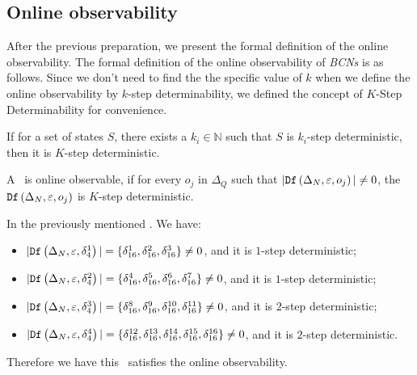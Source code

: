 \subsection{Online observability}
After the previous preparation, we present the formal definition of the online observability. The formal definition of the online observability of {\em BCNs} is as follows.
Since we don't need to find the the specific value of $k$ when we define the online observability by $k$-step determinability, we defined the concept of $K$-Step Determinability for convenience.
\begin{definition} 
If for a set of states $S$, there exists a $k_i\in \mathbb{N}$ such that $S$ is $k_i$-step deterministic, then it is $K$-step deterministic.
\end{definition}

\begin{definition}
 A \BCN\ is online observable,
if for every  $o_j$ in $\Delta_Q$ such that $|{\tt Df}\left(\Delta_N,\varepsilon, o_j\right)|\neq 0$, the ${\tt Df}\left(\Delta_N,\varepsilon,o_j\right)$ is $K$-step deterministic.
\end{definition}


\begin{example}
In the previously mentioned \BCN. We have:
 \begin{itemize}
 \item $|{\tt Df}\left(\Delta_N,\varepsilon, \delta_{4}^1\right)|=\{\delta_{16}^1,\delta_{16}^2,\delta_{16}^3\}\neq 0$, and it is $1$-step deterministic;
 \item $|{\tt Df}\left(\Delta_N,\varepsilon, \delta_{4}^2\right)|=\{\delta_{16}^4,\delta_{16}^5,\delta_{16}^6,\delta_{16}^7\}\neq 0$, and it is $1$-step deterministic;
 \item $|{\tt Df}\left(\Delta_N,\varepsilon, \delta_{4}^3\right)|=\{\delta_{16}^8,\delta_{16}^9,\delta_{16}^{10},\delta_{16}^{11}\}\neq 0$, and it is $2$-step deterministic;
 \item $|{\tt Df}\left(\Delta_N,\varepsilon, \delta_{4}^4\right)|=\{\delta_{16}^{12},\delta_{16}^{13},\delta_{16}^{14},\delta_{16}^{15},\delta_{16}^{16}\}\neq 0$, and it is $2$-step deterministic.
 \end{itemize}
 
Therefore we have this \BCN\ satisfies the online observability.
\end{example}  

